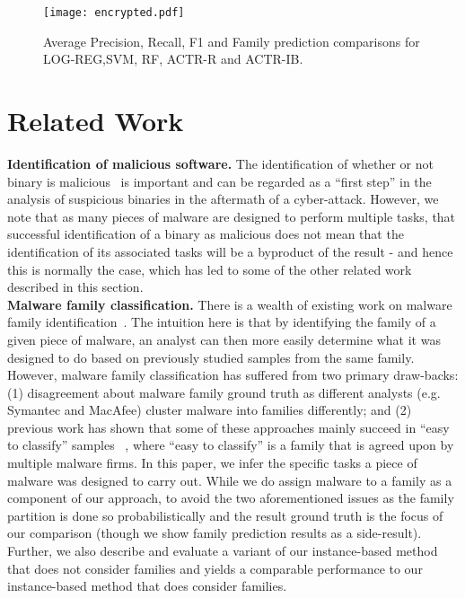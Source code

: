\documentclass[conference]{IEEEtran}
\begin{document}
\begin{figure}[htb!]
	\centerline{\texttt{[image: encrypted.pdf]}}
	\vspace{-1em}
	\caption{\textmd{Average Precision, Recall, F1 and Family prediction comparisons for LOG-REG,SVM, RF, ACTR-R and ACTR-IB.}}
	\vspace{-2.5em}
	\label{gvdg:5}
\end{figure}

\section{Related Work}
\label{rwSec}
\noindent\textbf{Identification of malicious software.}  The identification of whether or not binary is malicious~\cite{Firdausi:2010, Tamersoy:2014} is important and can be regarded as a ``first step'' in the analysis of suspicious binaries in the aftermath of a cyber-attack.  However, we note that as many pieces of malware are designed to perform multiple tasks, that successful identification of a binary as malicious does not mean that the identification of its associated tasks will be a byproduct of the result - and hence this is normally the case, which has led to some of the other related work described in this section.\smallskip\\
\noindent\textbf{Malware family classification.}  There is a wealth of existing work on malware family identification~\cite{Bayer_scalable, Kinable:2011, Kong:2013}.  The intuition here is that by identifying the family of a given piece of malware, an analyst can then more easily determine what it was designed to do based on previously studied samples from the same family. However, malware family classification has suffered from two primary draw-backs: (1) disagreement about malware family ground truth as different analysts (e.g. Symantec and MacAfee) cluster malware into families differently; and (2) previous work has shown that some of these approaches mainly succeed in ``easy to classify'' samples ~\cite{Li07onchallenges,PerdisciU12}, where ``easy to classify'' is a family that is agreed upon by multiple malware firms.  In this paper, we infer the specific tasks a piece of malware was designed to carry out.  While we do assign malware to a family as a component of our approach, to avoid the two aforementioned issues as the family partition is done so probabilistically and the result ground truth is the focus of our comparison (though we show family prediction results as a side-result).  Further, we also describe and evaluate a variant of our instance-based method that does not consider families and yields a comparable performance to our instance-based method that does consider families.
\end{document}

